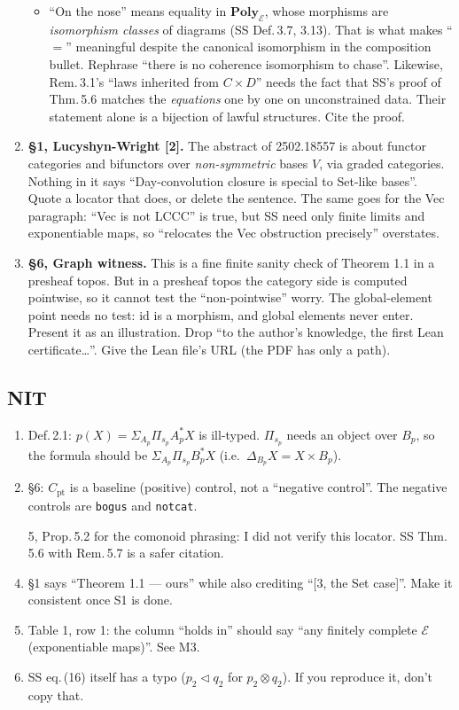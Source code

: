 \documentclass[11pt]{article}
\newcommand{\tri}{\mathbin{\triangleleft}}
\newcommand{\Poly}{\mathbf{Poly}}
\newcommand{\E}{\mathcal{E}}
\begin{document}
\begin{enumerate}[label=\textbf{S\arabic*.},leftmargin=*]
\begin{itemize}[leftmargin=*]
  \item ``On the nose'' means equality in $\Poly_\E$, whose morphisms are \emph{isomorphism classes}
    of diagrams (SS Def.\,3.7, 3.13). That is what makes ``$=$'' meaningful despite the canonical
    isomorphism in the composition bullet. Rephrase ``there is no coherence isomorphism to chase''.
    Likewise, Rem.\,3.1's ``laws inherited from $C\times D$'' needs the fact that SS's proof of
    Thm.\,5.6 matches the \emph{equations} one by one on unconstrained data. Their statement alone
    is a bijection of lawful structures. Cite the proof.
  \end{itemize}
\item \textbf{\S1, Lucyshyn-Wright [2].} The abstract of 2502.18557 is about functor categories
  and bifunctors over \emph{non-symmetric} bases $V$, via graded categories. Nothing in it says
  ``Day-convolution closure is special to Set-like bases''. Quote a locator that does, or delete the
  sentence. The same goes for the Vec paragraph: ``Vec is not LCCC'' is true, but SS need only finite
  limits and exponentiable maps, so ``relocates the Vec obstruction precisely'' overstates.
\item \textbf{\S6, Graph witness.} This is a fine finite sanity check of Theorem 1.1 in a presheaf
  topos. But in a presheaf topos the category side is computed pointwise, so it cannot test the
  ``non-pointwise'' worry. The global-element point needs no test: $\mathrm{id}$ is a morphism, and
  global elements never enter. Present it as an illustration. Drop ``to the author's knowledge, the
  first Lean certificate\dots''. Give the Lean file's URL (the PDF has only a path).
\end{enumerate}

\subsection*{NIT}
\begin{enumerate}[label=\textbf{N\arabic*.},leftmargin=*]
\item Def.\,2.1: $p(X)=\Sigma_{A_p}\Pi_{s_p}A_p^*X$ is ill-typed. $\Pi_{s_p}$ needs an object over
  $B_p$, so the formula should be $\Sigma_{A_p}\Pi_{s_p}B_p^*X$ (i.e.\ $\Delta_{B_p}X=X\times B_p$).
\item \S6: $C_{\mathrm{pt}}$ is a baseline (positive) control, not a ``negative control''. The negative
  controls are \texttt{bogus} and \texttt{notcat}.
\item [5, Prop.\,5.2] for the comonoid phrasing: I did not verify this locator. SS Thm.\,5.6 with
  Rem.\,5.7 is a safer citation.
\item \S1 says ``Theorem 1.1 --- ours'' while also crediting ``[3, the Set case]''. Make it
  consistent once S1 is done.
\item Table 1, row 1: the column ``holds in'' should say ``any finitely complete $\E$ (exponentiable
  maps)''. See M3.
\item SS eq.\,(16) itself has a typo ($p_2\tri q_2$ for $p_2\otimes q_2$). If you reproduce it,
  don't copy that.
\end{enumerate}
\end{document}
